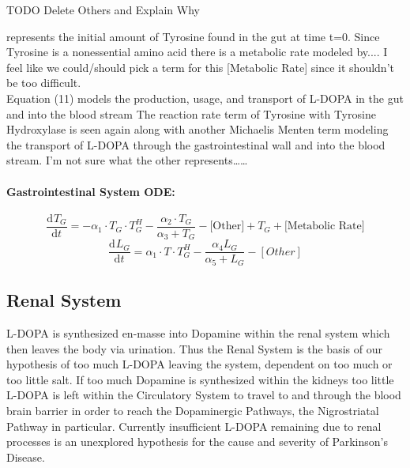 \documentclass[smallextended]{svjour3}
\newcommand{\od}[3][]{\ensuremath{\frac{\mathrm{d}^{#1} {#2}}{\mathrm{d}{#3}^{#1}}}}
\newcommand{\todo}[1]{{\huge\color{red}TODO {#1}}}
\begin{document}
\todo{Delete Others and Explain Why}

represents the initial amount of Tyrosine found in the gut at time t=0. Since Tyrosine is a nonessential amino acid there is a metabolic rate modeled by.... I feel like we could/should pick a term for this [Metabolic Rate] since it shouldn't be too difficult. \\
\indent Equation (11) models the production, usage, and transport of L-DOPA in the gut and into the blood stream The reaction rate term of Tyrosine with Tyrosine Hydroxylase is seen again along with another Michaelis Menten term modeling the transport of L-DOPA through the gastrointestinal wall and into the blood stream. I’m not sure what the other represents……
\paragraph{Gastrointestinal System ODE:}
\begin{equation}
\label{eq:10}
\od{T_G}{t}= -\alpha_1 \cdot T_G \cdot T_G^H - \frac{\alpha_2 \cdot T_G}{\alpha_3 + T_G} -\text{[Other]}+T_G +\text{[Metabolic Rate]}
\end{equation}
\begin{equation}
\label{eq:11}
\od{L_G}{t}=\alpha_1\cdot T \cdot T_G^H - \frac{\alpha_4 L_G}{\alpha_5 + L_G} - [Other]
\end{equation}
\subsection{Renal System}
L-DOPA is synthesized en-masse into Dopamine within the renal system which then leaves the body via urination.  Thus the Renal System is the basis of our hypothesis of too much L-DOPA leaving the system, dependent on too much or too little salt.  If too much Dopamine is synthesized within the kidneys too little L-DOPA is left within the Circulatory System to travel to and through the blood brain barrier in order to reach the Dopaminergic Pathways, the Nigrostriatal Pathway in particular.  Currently insufficient L-DOPA remaining due to renal processes is an unexplored hypothesis for the cause and severity of Parkinson's Disease.  
\end{document}
